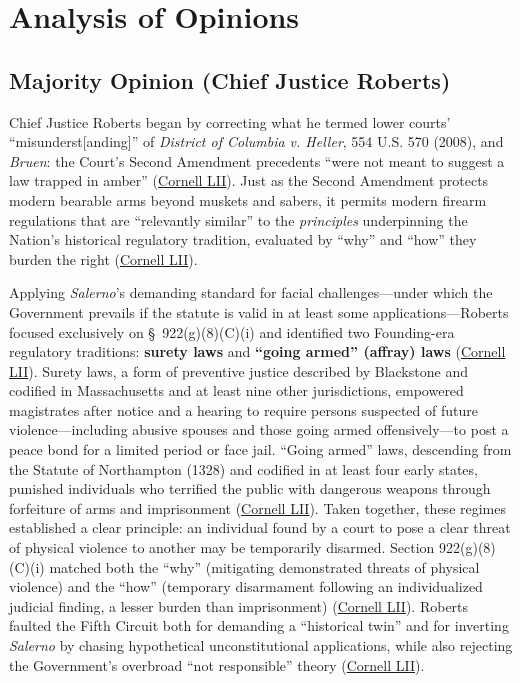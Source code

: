 \documentclass[12pt]{article}
\begin{document}
\section{Analysis of Opinions}

\subsection{Majority Opinion (Chief Justice Roberts)}

Chief Justice Roberts began by correcting what he termed lower courts' ``misunderst[anding]'' of \textit{District of Columbia v. Heller}, 554 U.S. 570 (2008), and \textit{Bruen}: the Court's Second Amendment precedents ``were not meant to suggest a law trapped in amber'' (\href{https://www.law.cornell.edu/supremecourt/text/22-915}{Cornell LII}). Just as the Second Amendment protects modern bearable arms beyond muskets and sabers, it permits modern firearm regulations that are ``relevantly similar'' to the \textit{principles} underpinning the Nation's historical regulatory tradition, evaluated by ``why'' and ``how'' they burden the right (\href{https://www.law.cornell.edu/supremecourt/text/22-915}{Cornell LII}).

Applying \textit{Salerno}'s demanding standard for facial challenges---under which the Government prevails if the statute is valid in at least some applications---Roberts focused exclusively on \S\ 922(g)(8)(C)(i) and identified two Founding-era regulatory traditions: \textbf{surety laws} and \textbf{``going armed'' (affray) laws} (\href{https://www.law.cornell.edu/supremecourt/text/22-915}{Cornell LII}). Surety laws, a form of preventive justice described by Blackstone and codified in Massachusetts and at least nine other jurisdictions, empowered magistrates after notice and a hearing to require persons suspected of future violence---including abusive spouses and those going armed offensively---to post a peace bond for a limited period or face jail. ``Going armed'' laws, descending from the Statute of Northampton (1328) and codified in at least four early states, punished individuals who terrified the public with dangerous weapons through forfeiture of arms and imprisonment (\href{https://www.law.cornell.edu/supremecourt/text/22-915}{Cornell LII}). Taken together, these regimes established a clear principle: an individual found by a court to pose a clear threat of physical violence to another may be temporarily disarmed. Section 922(g)(8)(C)(i) matched both the ``why'' (mitigating demonstrated threats of physical violence) and the ``how'' (temporary disarmament following an individualized judicial finding, a lesser burden than imprisonment) (\href{https://www.law.cornell.edu/supremecourt/text/22-915}{Cornell LII}). Roberts faulted the Fifth Circuit both for demanding a ``historical twin'' and for inverting \textit{Salerno} by chasing hypothetical unconstitutional applications, while also rejecting the Government's overbroad ``not responsible'' theory (\href{https://www.law.cornell.edu/supremecourt/text/22-915}{Cornell LII}).
\end{document}
